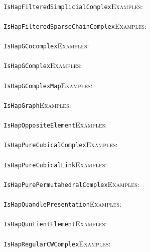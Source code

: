 \documentclass[a4paper,11pt]{report}
\begin{document}
{{ \\
 \texttt{IsHapFilteredSimplicialComplex}{\nobreakspace}{\nobreakspace}{\nobreakspace}{\nobreakspace}\textsc{Examples:} \\
 \\
 \texttt{IsHapFilteredSparseChainComplex}{\nobreakspace}{\nobreakspace}{\nobreakspace}{\nobreakspace}\textsc{Examples:} \\
 \\
 \texttt{IsHapGCocomplex}{\nobreakspace}{\nobreakspace}{\nobreakspace}{\nobreakspace}\textsc{Examples:} \\
 \\
 \texttt{IsHapGComplex}{\nobreakspace}{\nobreakspace}{\nobreakspace}{\nobreakspace}\textsc{Examples:} \\
 \\
 \texttt{IsHapGComplexMap}{\nobreakspace}{\nobreakspace}{\nobreakspace}{\nobreakspace}\textsc{Examples:} \\
 \\
 \texttt{IsHapGraph}{\nobreakspace}{\nobreakspace}{\nobreakspace}{\nobreakspace}\textsc{Examples:} \\
 \\
 \texttt{IsHapOppositeElement}{\nobreakspace}{\nobreakspace}{\nobreakspace}{\nobreakspace}\textsc{Examples:} \\
 \\
 \texttt{IsHapPureCubicalComplex}{\nobreakspace}{\nobreakspace}{\nobreakspace}{\nobreakspace}\textsc{Examples:} \\
 \\
 \texttt{IsHapPureCubicalLink}{\nobreakspace}{\nobreakspace}{\nobreakspace}{\nobreakspace}\textsc{Examples:} \\
 \\
 \texttt{IsHapPurePermutahedralComplex}{\nobreakspace}{\nobreakspace}{\nobreakspace}{\nobreakspace}\textsc{Examples:} \\
 \\
 \texttt{IsHapQuandlePresentation}{\nobreakspace}{\nobreakspace}{\nobreakspace}{\nobreakspace}\textsc{Examples:} \\
 \\
 \texttt{IsHapQuotientElement}{\nobreakspace}{\nobreakspace}{\nobreakspace}{\nobreakspace}\textsc{Examples:} \\
 \\
 \texttt{IsHapRegularCWComplex}{\nobreakspace}{\nobreakspace}{\nobreakspace}{\nobreakspace}\textsc{Examples:} \\
 \\
}}
\end{document}
